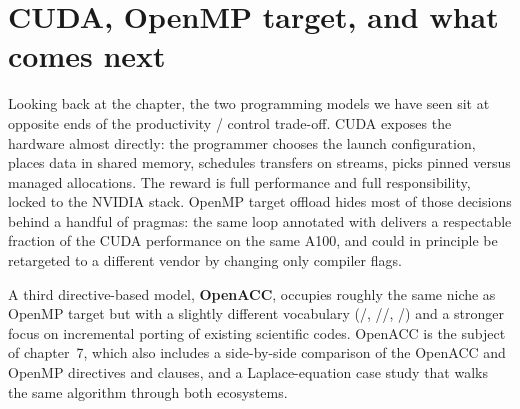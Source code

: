 \section{CUDA, OpenMP target, and what comes next}

Looking back at the chapter, the two programming models we have seen sit at opposite ends of the productivity / control trade-off. CUDA exposes the hardware almost directly: the programmer chooses the launch configuration, places data in shared memory, schedules transfers on streams, picks pinned versus managed allocations. The reward is full performance and full responsibility, locked to the NVIDIA stack. OpenMP target offload hides most of those decisions behind a handful of pragmas: the same loop annotated with  delivers a respectable fraction of the CUDA performance on the same A100, and could in principle be retargeted to a different vendor by changing only compiler flags.

A third directive-based model, \textbf{OpenACC}, occupies roughly the same niche as OpenMP target but with a slightly different vocabulary (/, //, /) and a stronger focus on incremental porting of existing scientific codes. OpenACC is the subject of chapter~7, which also includes a side-by-side comparison of the OpenACC and OpenMP directives and clauses, and a Laplace-equation case study that walks the same algorithm through both ecosystems.
